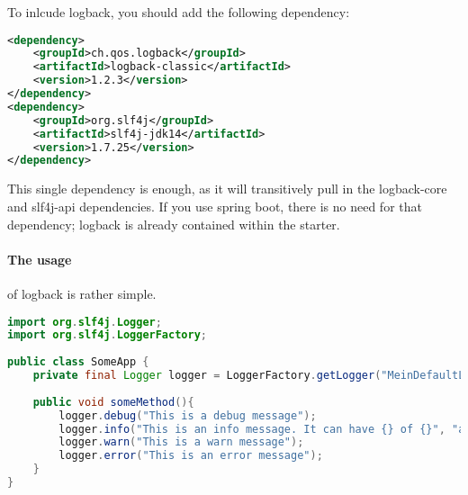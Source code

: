  To inlcude logback, you should add the following dependency: 
 \begin{lstlisting}[language=xml]
 <dependency>
    <groupId>ch.qos.logback</groupId>
    <artifactId>logback-classic</artifactId>
    <version>1.2.3</version>
</dependency>
<dependency>
	<groupId>org.slf4j</groupId>
	<artifactId>slf4j-jdk14</artifactId>
	<version>1.7.25</version>
</dependency>
 \end{lstlisting}
 This single dependency is enough, as it will transitively pull in the logback-core and slf4j-api dependencies. If you use spring boot, there is no need for that dependency; logback is already contained within the starter.
 
\paragraph{The usage} of logback is rather simple. 
\begin{lstlisting}[language=java]
import org.slf4j.Logger;
import org.slf4j.LoggerFactory;
 
public class SomeApp {
    private final Logger logger = LoggerFactory.getLogger("MeinDefaultLogger");
    
    public void someMethod(){
        logger.debug("This is a debug message");
        logger.info("This is an info message. It can have {} of {}", "all kinds of", "parameters");
        logger.warn("This is a warn message");
        logger.error("This is an error message");
    }
}
\end{lstlisting}

